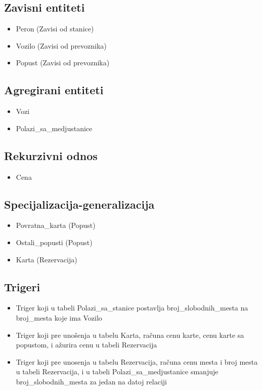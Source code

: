 \documentclass[12pt]{article}
\begin{document}
\subsection{Zavisni entiteti}
\begin{itemize}
	\item Peron (Zavisi od stanice)
	\item Vozilo (Zavisi od prevoznika)
	\item Popust (Zavisi od prevoznika)
\end{itemize}

\subsection{Agregirani entiteti}
\begin{itemize}
	\item Vozi
	\item Polazi\_sa\_medjustanice
\end{itemize}

\subsection{Rekurzivni odnos}
\begin{itemize}
	\item Cena
\end{itemize}

\subsection{Specijalizacija-generalizacija}
\begin{itemize}
	\item Povratna\_karta (Popust)
	\item Ostali\_popusti (Popust)
	\item Karta (Rezervacija)
\end{itemize}

\subsection{Trigeri}
\begin{itemize}
	\item Triger koji u tabeli Polazi\_sa\_stanice postavlja broj\_slobodnih\_mesta na broj\_mesta koje ima Vozilo
	\item Triger koji pre uno\v senja u tabelu Karta, ra\v cuna cenu karte, cenu karte sa popustom, i a\v zurira cenu u tabeli Rezervacija 
	\item Triger koji pre unosenja u tabelu Rezervacija, ra\v cuna cenu mesta i broj mesta u tabeli Rezervacija, i u tabeli Polazi\_sa\_medjustanice smanjuje broj\_slobodnih\_mesta za jedan na datoj relaciji
\end{itemize}
\end{document}
